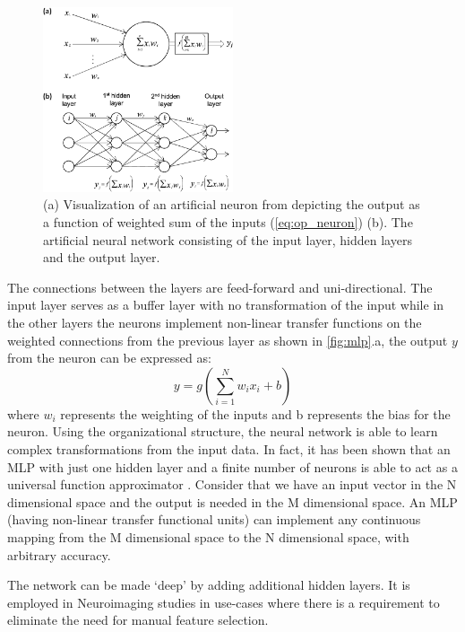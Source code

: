 \documentclass[msthesis.tex]{subfiles}
\begin{document}
\begin{figure}
    \centering
    \includegraphics[width=0.5\textwidth]{images/tnn_ann.png}
    \caption{(a) Visualization of an artificial neuron from \cite{vieira2017using} depicting the output as a function of weighted sum of the inputs (\autoref{eq:op_neuron}) (b). The artificial neural network consisting of the input layer, hidden layers and the output layer.}
    \label{fig:mlp}
\end{figure}
The connections between the layers are feed-forward and uni-directional. The input layer serves as a buffer layer with no transformation of the input while in the other layers the neurons implement non-linear transfer functions on the weighted connections from the previous layer as shown in \autoref{fig:mlp}.a, the output $y$ from the neuron can be expressed as:
\begin{equation}
    \label{eq:op_neuron}
    y = g(\sum_{i=1}^{N} w_i x_i +b) 
\end{equation}
where $w_i$ represents the weighting of the inputs and b represents the bias for the neuron. Using the organizational structure, the neural network is able to learn complex transformations from the input data. In fact, it has been shown that an \gls{MLP} with just one hidden layer and a finite number of neurons is able to act as a universal function approximator \citep{universal_mlp}. Consider that we have an input vector in the N dimensional space and the output is needed in the M dimensional space. An \gls{MLP} (having non-linear transfer functional units) can implement any continuous mapping from the M dimensional space to the N dimensional space, with arbitrary accuracy. 

The network can be made `deep' by adding additional hidden layers. It is employed in Neuroimaging studies in use-cases where there is a requirement to eliminate the need for manual feature selection.
\end{document}
